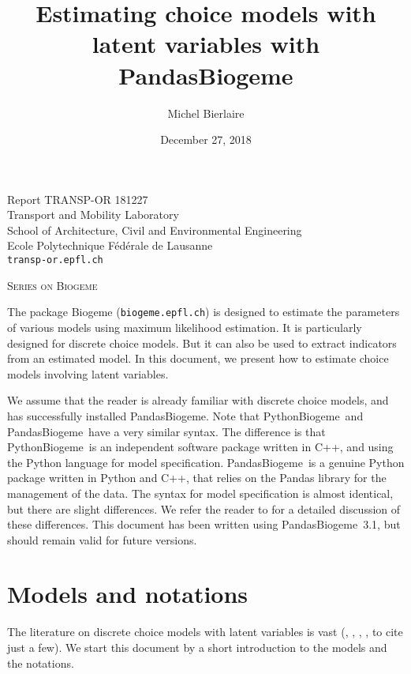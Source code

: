 \documentclass[12pt,a4paper]{article}
\title{Estimating choice models with latent variables with PandasBiogeme}
\author{Michel Bierlaire}
\date{December 27, 2018}
\newcommand{\PBIOGEME}{PythonBiogeme}
\newcommand{\PDBIOGEME}{PandasBiogeme}
\begin{document}
\begin{titlepage}
\pagestyle{empty}

\maketitle
\vspace{2cm}

\begin{center}
\small Report TRANSP-OR 181227  \\ Transport and Mobility Laboratory \\ School of Architecture, Civil and Environmental Engineering \\ Ecole Polytechnique F\'ed\'erale de Lausanne \\ \verb+transp-or.epfl.ch+
\begin{center}
\textsc{Series on Biogeme}
\end{center}
\end{center}


\clearpage
\end{titlepage}


The package Biogeme (\texttt{biogeme.epfl.ch}) is designed to estimate the parameters of
various models using maximum likelihood estimation. It is particularly
designed for discrete choice models. But it can also be used to extract indicators from an estimated
model.  In
this document, we present how to estimate choice models involving
latent variables.

We assume that the reader is already familiar with discrete choice
models, and has successfully installed \PDBIOGEME. Note that
\PBIOGEME\ and \PDBIOGEME\ have a very similar syntax. The difference
is that \PBIOGEME\ is an independent software package written in C++,
and using the Python language for model specification. \PDBIOGEME\ is
a genuine Python package written in Python and C++, that relies on the
Pandas library for the management of the data. The syntax for model
specification is almost identical, but there are slight
differences. We refer the reader to  for a detailed
discussion of these differences. This document has
been written using \PDBIOGEME\ 3.1, but should remain valid for future
versions.



\section{Models and notations}

The literature on discrete choice models with latent variables is vast
(\cite{walker2001extended}, \cite{ashok2002extending},
\cite{greene2003latent}, \cite{ben2002integration}, to cite just a
few). We start this document by a short introduction to the models and
the notations. 
\end{document}

